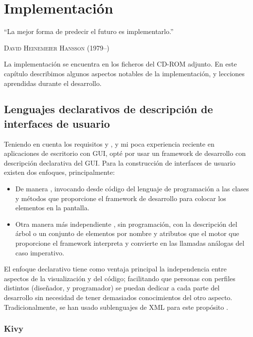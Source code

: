 
\chapter{Implementación}
\label{chap:implementacion}

\epigraph{``La mejor forma de predecir el futuro es implementarlo.''}{\textsc{David Heinemeier Hansson} (1979--)}

La implementación se encuentra en los ficheros del CD-ROM adjunto. En este capítulo describimos algunos aspectos notables de la implementación, y lecciones aprendidas durante el desarrollo.

\section{Lenguajes declarativos de descripción de interfaces de usuario}

Teniendo en cuenta los requisitos  y , y mi poca experiencia reciente en aplicaciones de escritorio con GUI, opté por usar un framework de desarrollo con descripción declarativa del GUI. Para la construcción de interfaces de usuario existen dos enfoques, principalmente:
\begin{itemize}
\item De manera , invocando desde código del lenguaje de programación a las clases y métodos que proporcione el framework de desarrollo para colocar los elementos en la pantalla.
\item Otra manera más independiente , sin programación, con la descripción del árbol o un conjunto de elementos por nombre y atributos que el motor que proporcione el framework interpreta y convierte en las llamadas análogas del caso imperativo.
\end{itemize}

El enfoque declarativo tiene como ventaja principal la independencia entre aspectos de la visualización y del código; facilitando que personas con perfiles distintos (diseñador, y programador) se puedan dedicar a cada parte del desarrollo sin necesidad de tener demasiados conocimientos del otro aspecto. Tradicionalmente, se han usado sublenguajes de XML para este propósito \citep{Hurtado2004}.

\subsection{Kivy}

